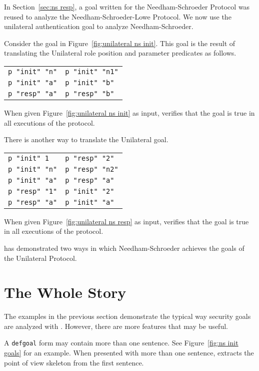 \documentclass[12pt]{article}
\begin{document}
In Section~\ref{sec:ns resp}, a goal written for the Needham-Schroeder
Protocol was reused to analyze the Needham-Schroeder-Lowe Protocol.
We now use the unilateral authentication goal to analyze
Needham-Schroeder.

Consider the goal in Figure~\ref{fig:unilateral ns init}.  This goal
is the result of translating the Unilateral role position and
parameter predicates as follows.
\begin{center}
\begin{tabular}{l@{$\quad\rightarrow\quad$}l}
  \texttt{p "init" "n"}&\texttt{p "init" "n1"}\\
  \texttt{p "init" "a"}&\texttt{p "init" "b"}\\
  \texttt{p "resp" "a"}&\texttt{p "resp" "b"}
\end{tabular}
\end{center}
When given Figure~\ref{fig:unilateral ns init} as input, {\cpsa}
verifies that the goal is true in all executions of the protocol.

There is another way to translate the Unilateral goal.
\begin{center}
\begin{tabular}{l@{$\quad\rightarrow\quad$}l}
  \texttt{p "init" 1}&\texttt{p "resp" "2"}\\
  \texttt{p "init" "n"}&\texttt{p "resp" "n2"}\\
  \texttt{p "init" "a"}&\texttt{p "resp" "a"}\\
  \texttt{p "resp" "1"}&\texttt{p "init" "2"}\\
  \texttt{p "resp" "a"}&\texttt{p "init" "a"}
\end{tabular}
\end{center}
When given Figure~\ref{fig:unilateral ns resp} as input, {\cpsa}
verifies that the goal is true in all executions of the protocol.

{\cpsa} has demonstrated two ways in which Needham-Schroeder achieves
the goals of the Unilateral Protocol.

\section{The Whole Story}\label{sec:whole story}

The examples in the previous section demonstrate the typical way
security goals are analyzed with {\cpsa}.  However, there are more
features that may be useful.

A \texttt{defgoal} form may contain more than one sentence.  See
Figure~\ref{fig:ns init goals} for an example.  When presented with
more than one sentence, {\cpsa} extracts the point of view skeleton
from the first sentence.
\end{document}
